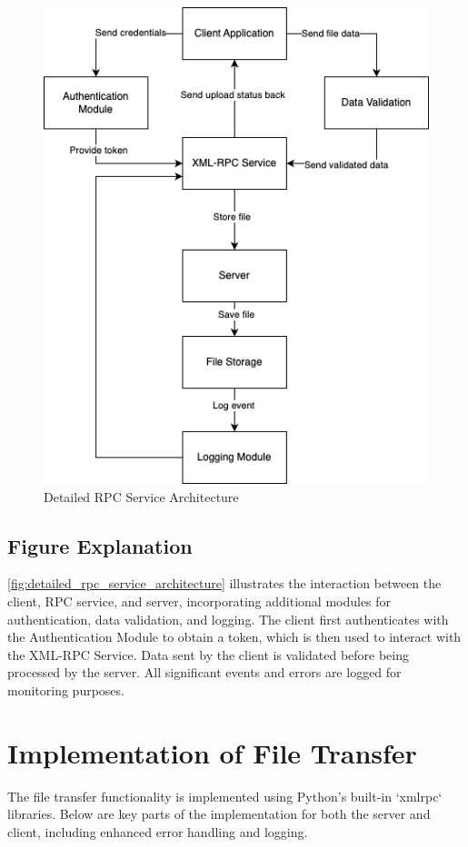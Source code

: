\documentclass[12pt]{article}
\begin{document}
\begin{figure}[H]
    \centering
    \includegraphics[width=\linewidth]{figure1.png}
    \caption{Detailed RPC Service Architecture}
    \label{fig:detailed_rpc_service_architecture}
\end{figure}

\subsection{Figure Explanation}
\autoref{fig:detailed_rpc_service_architecture} illustrates the interaction between the client, RPC service, and server, incorporating additional modules for authentication, data validation, and logging. The client first authenticates with the Authentication Module to obtain a token, which is then used to interact with the XML-RPC Service. Data sent by the client is validated before being processed by the server. All significant events and errors are logged for monitoring purposes.

\section{Implementation of File Transfer}
The file transfer functionality is implemented using Python's built-in `xmlrpc` libraries. Below are key parts of the implementation for both the server and client, including enhanced error handling and logging.
\end{document}
